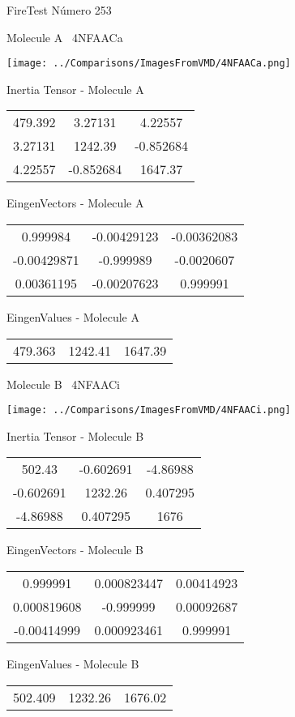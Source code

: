 \vtab[-3cm]
\begin{center}
{\large FireTest \tab Número 253}
\end{center}
\begin{multicols}{2}
\begin{center}

Molecule A \
4NFAACa

\texttt{[image: ../Comparisons/ImagesFromVMD/4NFAACa.png]}

Inertia Tensor - Molecule A \\
\begin{tabular}{|c c c|}
479.392	 & 	3.27131	 & 	4.22557	 \\
3.27131	 & 	1242.39	 & 	-0.852684	 \\
4.22557	 & 	-0.852684	 & 	1647.37
\end{tabular}

\vtab
 EingenVectors - Molecule A     \\
\begin{tabular}{|c c c|}
0.999984	 & 	-0.00429123	 & 	-0.00362083	 \\
-0.00429871	 & 	-0.999989	 & 	-0.0020607	 \\
0.00361195	 & 	-0.00207623	 & 	0.999991
\end{tabular}

\vtab
 EingenValues - Molecule A     \\
\begin{tabular}{|c c c|}
479.363	 & 	1242.41	 & 	1647.39	 \\
\end{tabular}
\columnbreak

Molecule B \
4NFAACi

\texttt{[image: ../Comparisons/ImagesFromVMD/4NFAACi.png]}

Inertia Tensor - Molecule B \\
\begin{tabular}{|c c c|}
502.43	 & 	-0.602691	 & 	-4.86988	 \\
-0.602691	 & 	1232.26	 & 	0.407295	 \\
-4.86988	 & 	0.407295	 & 	1676
\end{tabular}

\vtab
 EingenVectors - Molecule B     \\
\begin{tabular}{|c c c|}
0.999991	 & 	0.000823447	 & 	0.00414923	 \\
0.000819608	 & 	-0.999999	 & 	0.00092687	 \\
-0.00414999	 & 	0.000923461	 & 	0.999991
\end{tabular}

\vtab
 EingenValues - Molecule B     \\
\begin{tabular}{|c c c|}
502.409	 & 	1232.26	 & 	1676.02	 \\
\end{tabular}

\end{center}
\end{multicols}

